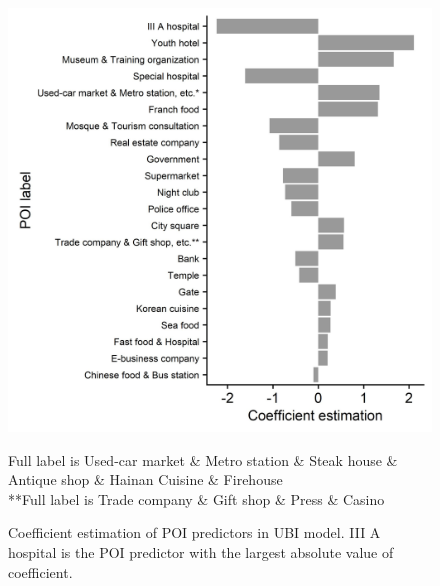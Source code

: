 \documentclass[sii]{ipart}
\theoremstyle{plain}
\begin{document}
\begin{figure}[h!]
	\centering

	\includegraphics[width=1\linewidth]{coef}
	\caption*{\scriptsize*Full label is Used-car market \& Metro station \& Steak house \& Antique shop \& Hainan Cuisine \& Firehouse\\
	**Full label is Trade company \& Gift shop \& Press \& Casino }

	\small\caption[]{Coefficient estimation of POI predictors in UBI model. III A hospital is the POI predictor with the largest absolute value of coefficient.}
	\label{fig:coefficient}

\end{figure}
\end{document}
